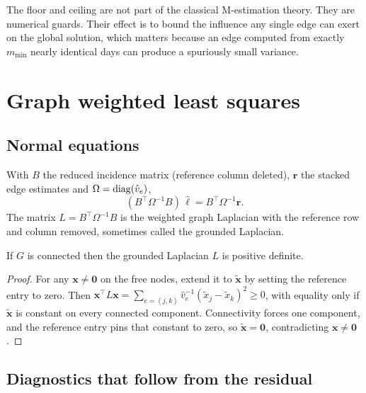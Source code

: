 \documentclass[12pt,a4paper,oneside]{article}
\begin{document}
\begin{remark}
The floor and ceiling are not part of the classical M-estimation theory. They
are numerical guards. Their effect is to bound the influence any single edge can
exert on the global solution, which matters because an edge computed from
exactly $m_{\min}$ nearly identical days can produce a spuriously small
variance.
\end{remark}

\section{Graph weighted least squares}

\subsection{Normal equations}

With $B$ the reduced incidence matrix (reference column deleted),
$\bm{r}$ the stacked edge estimates and $\Omega=\operatorname{diag}(\hat{v}_e)$,
\begin{equation}
(B^\top\Omega^{-1}B)\,\hat{\bm{\ell}}=B^\top\Omega^{-1}\bm{r}.
\end{equation}
The matrix $L=B^\top\Omega^{-1}B$ is the weighted graph Laplacian with the
reference row and column removed, sometimes called the grounded Laplacian.

\begin{proposition}
If $G$ is connected then the grounded Laplacian $L$ is positive definite.
\end{proposition}

\begin{proof}
For any $\bm{x}\neq\bm{0}$ on the free nodes, extend it to $\tilde{\bm{x}}$ by
setting the reference entry to zero. Then
$\bm{x}^\top L\bm{x}=\sum_{e=(j,k)}\hat{v}_e^{-1}(\tilde{x}_j-\tilde{x}_k)^2\ge 0$,
with equality only if $\tilde{\bm{x}}$ is constant on every connected component.
Connectivity forces one component, and the reference entry pins that constant to
zero, so $\tilde{\bm{x}}=\bm{0}$, contradicting $\bm{x}\neq\bm{0}$.
\end{proof}

\subsection{Diagnostics that follow from the residual}
\end{document}
